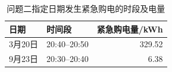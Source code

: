 \begin{table}[H]
\centering
\caption{问题二指定日期发生紧急购电的时段及电量}
\label{tab:q2_emergency_purchase}
\begin{tabular}{llr}
\toprule
日期 & 时间段 & 紧急购电量/kWh \\
\midrule
3月20日 & 20:40--20:50 & 329.52 \\
9月23日 & 20:30--20:40 & 6.38 \\
\bottomrule
\end{tabular}
\end{table}
